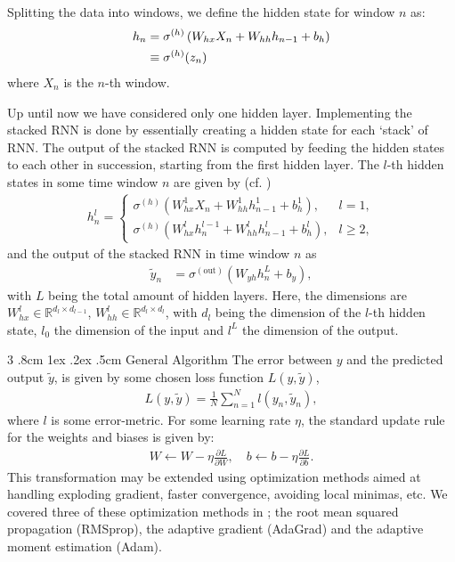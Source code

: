 \documentclass[%
reprint,
amsmath,amssymb,
aps,
]{revtex4-2}
\makeatletter
\renewcommand{\subsubsection}{%
	\@startsection
	{subsubsection}%
	{3}%
	{\z@}%
	{.8cm \@plus1ex \@minus .2ex}%
	{.5cm}%
	{\normalfont\small\centering}%
}
\makeatother
\begin{document}
Splitting the data into windows, we define the hidden state for window \(n\) as:
\begin{align}
	h_{n} &= \sigma^{(h)}\left( W_{hx}X_{n} + W_{hh}h_{n-1} + b_{h} \right) \notag \\
	&\equiv \sigma^{(h)}(z_{n})
\end{align}
where \(X_{n}\) is the \(n\)-th window.

Up until now we have considered only one hidden layer. Implementing the stacked RNN is done by essentially creating a hidden state for each `stack' of RNN. The output of the stacked RNN is computed by feeding the hidden states to each other in succession, starting from the first hidden layer. The \(l\)-th hidden states in some time window \(n\) are given by (cf. \cite{pascanu2014constructdeeprecurrentneural})
\begin{align}
	h^{l}_{n} = \begin{cases}
		\sigma^{(h)}\left( W_{hx}^{1}X_{n} + W_{hh}^{1}h_{n-1}^{1} + b_{h}^{1}\right), &l=1, \\
		\sigma^{(h)}\left( W_{hx}^{l}h_{n}^{l-1} + W_{hh}^{l}h_{n-1}^{l} + b_{h}^{l}\right), &l\geq 2,
	\end{cases}\label{eq:hidden_states_L}
\end{align}	
and the output of the stacked RNN in time window \(n\) as
\begin{align}
	\tilde{y}_{n} &= \sigma^{(\text{out})}\left( W_{yh}h^{L}_{n} + b_{y} \right),
\end{align}
with \(L\) being the total amount of hidden layers. 
Here, the dimensions are \(W^{l}_{hx}\in\mathbb{R}^{d_{l}\times d_{l-1}}\), \(W^{l}_{hh}\in\mathbb{R}^{d_{l}\times d_{l}}\), with \(d_l\) being the dimension of the \(l\)-th hidden state, \(l_0\) the dimension of the input and \(l^{L}\) the dimension of the output.

\subsubsection{General Algorithm}
The error between \(y\) and the predicted output \(\tilde{y}\), is given by some chosen loss function \(L(y, \tilde{y})\),
\begin{align}	
	L(y,\tilde{y}) = \frac{1}{N}\sum\limits_{n=1}^{N} l(y_{n}, \tilde{y}_n),
\end{align}
where \(l\) is some error-metric. 
For some learning rate \(\eta\), the standard update rule for the weights and biases is given by:
\begin{align}	\label{eq:learning_rate}
	W\leftarrow W-\eta \frac{\partial L}{\partial W},\quad b\leftarrow b-\eta \frac{\partial L}{\partial b}.
\end{align}
This transformation may be extended using optimization methods aimed at handling exploding gradient, faster convergence, avoiding local minimas, etc. We covered three of these optimization methods in \cite{project2}; the root mean squared propagation (RMSprop), the adaptive gradient (AdaGrad) and the adaptive moment estimation (Adam). 
\end{document}
